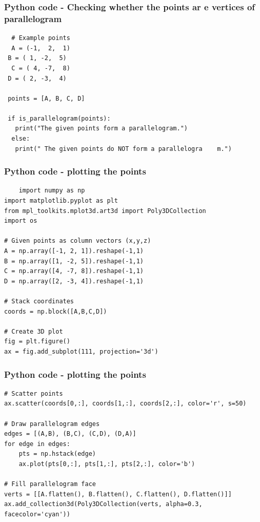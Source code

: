 \documentclass{beamer}
\begin{document}
\begin{frame}[fragile]                           
	\frametitle{Python code - Checking whether the points ar    e vertices of parallelogram}             
	\begin{lstlisting}
  # Example points
  A = (-1,  2,  1)
 B = ( 1, -2,  5)
  C = ( 4, -7,  8)
 D = ( 2, -3,  4)

 points = [A, B, C, D]

 if is_parallelogram(points):
   print("The given points form a parallelogram.")
  else:
   print(" The given points do NOT form a parallelogra    m.")
    \end{lstlisting}
\end{frame}
\begin{frame}[fragile]                              
	\frametitle{Python code - plotting the points}
	\begin{lstlisting}
	import numpy as np
import matplotlib.pyplot as plt
from mpl_toolkits.mplot3d.art3d import Poly3DCollection
import os

# Given points as column vectors (x,y,z)
A = np.array([-1, 2, 1]).reshape(-1,1)
B = np.array([1, -2, 5]).reshape(-1,1)
C = np.array([4, -7, 8]).reshape(-1,1)
D = np.array([2, -3, 4]).reshape(-1,1)

# Stack coordinates
coords = np.block([A,B,C,D])

# Create 3D plot
fig = plt.figure()
ax = fig.add_subplot(111, projection='3d')

\end{lstlisting}                               
\end{frame}
\begin{frame}[fragile]                              
	\frametitle{Python code - plotting the points}
	\begin{lstlisting}
# Scatter points
ax.scatter(coords[0,:], coords[1,:], coords[2,:], color='r', s=50)

# Draw parallelogram edges
edges = [(A,B), (B,C), (C,D), (D,A)]
for edge in edges:
    pts = np.hstack(edge)
    ax.plot(pts[0,:], pts[1,:], pts[2,:], color='b')

# Fill parallelogram face
verts = [[A.flatten(), B.flatten(), C.flatten(), D.flatten()]]
ax.add_collection3d(Poly3DCollection(verts, alpha=0.3, facecolor='cyan'))

\end{lstlisting}                               
\end{frame}
\end{document}
